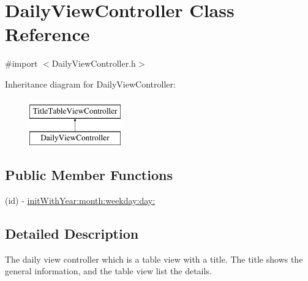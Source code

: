 \hypertarget{interface_daily_view_controller}{\section{\-Daily\-View\-Controller \-Class \-Reference}
\label{interface_daily_view_controller}
}


{\ttfamily \#import $<$\-Daily\-View\-Controller.\-h$>$}

\-Inheritance diagram for \-Daily\-View\-Controller\-:\begin{figure}[H]
\begin{center}
\leavevmode
\includegraphics[height=2.000000cm]{interface_daily_view_controller}
\end{center}
\end{figure}
\subsection*{\-Public \-Member \-Functions}
\begin{DoxyCompactItemize}
\item 
(id) -\/ \hyperlink{interface_daily_view_controller_a878944aa1f745382d93c4dce2f22b431}{init\-With\-Year\-:month\-:weekday\-:day\-:}
\end{DoxyCompactItemize}


\subsection{\-Detailed \-Description}
\-The daily view controller which is a table view with a title. \-The title shows the general information, and the table view list the details. 

